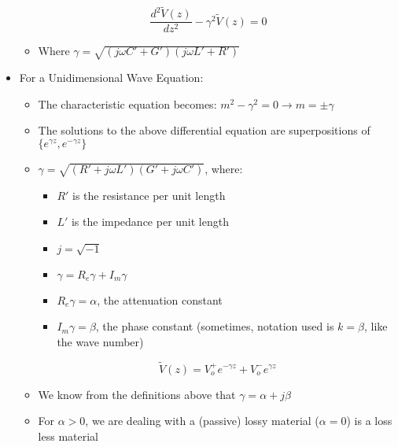\begin{itemize}
    $$\boxed{\frac{d^2 \tilde{V}(z)}{dz^2}-\gamma^2\tilde{V}(z)=0}$$

    \begin{itemize}

      \item Where $\gamma=\sqrt{(j\omega C' + G')(j\omega L' + R')}$

    \end{itemize}

  \item For a Unidimensional Wave Equation:

    \begin{itemize}

      \item The characteristic equation becomes: $m^2-\gamma^2=0\rightarrow m=\pm\gamma$

      \item The solutions to the above differential equation are superpositions of $\{e^{\gamma z},e^{-\gamma z}\}$

      \item $\gamma=\sqrt{(R'+j\omega L')(G'+j\omega C')}$, where:

        \begin{itemize}

          \item $R'$ is the resistance per unit length

          \item $L'$ is the impedance per unit length

          \item $j=\sqrt{-1}$

          \item $\gamma=R_e\gamma + I_m\gamma$

          \item $R_e\gamma=\alpha$, the attenuation constant

          \item $I_m\gamma=\beta$, the phase constant (sometimes, notation used is $k=\beta$, like the wave number)

        \end{itemize}

      $$\widetilde{V}(z)=V_o^+e^{-\gamma z}+V_o^-e^{\gamma z}$$

    \item We know from the definitions above that $\gamma=\alpha + j\beta$

    \item For $\alpha>0$, we are dealing with a (passive) lossy material ($\alpha=0$) is a loss less material


\end{itemize}
\end{itemize}
